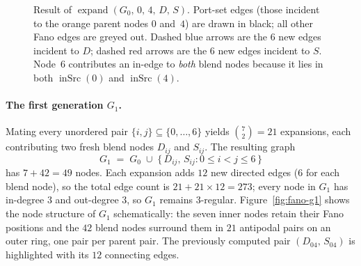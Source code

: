 \documentclass[11pt, a4paper]{article}
\theoremstyle{definition}
\theoremstyle{plain}
\theoremstyle{remark}
\newcommand{\inSrc}{\operatorname{inSrc}}
\newcommand{\expand}{\operatorname{expand}}
\begin{document}
\begin{figure}[ht]
\caption{Result of $\expand(G_0,\,0,\,4,\,D,\,S)$.  Port-set edges (those
incident to the orange parent nodes $0$ and~$4$) are drawn in black; all
other Fano edges are greyed out.  Dashed blue arrows are the $6$ new edges
incident to $D$; dashed red arrows are the $6$ new edges incident to $S$.
Node~$6$ contributes an in-edge to \emph{both} blend nodes because it lies
in both $\inSrc(0)$ and $\inSrc(4)$.}
\label{fig:fano-expand1}
\end{figure}

\paragraph{The first generation $G_1$.}
Mating every unordered pair $\{i,j\} \subseteq \{0,\ldots,6\}$ yields
$\binom{7}{2} = 21$ expansions, each contributing two fresh blend nodes
$D_{ij}$ and $S_{ij}$.  The resulting graph
\[
  G_1 \;=\; G_0 \;\cup\; \bigl\{\,D_{ij},\,S_{ij} : 0 \le i < j \le 6\,\bigr\}
\]
has $7 + 42 = 49$ nodes.  Each expansion adds $12$ new directed edges ($6$ for
each blend node), so the total edge count is $21 + 21 \times 12 = 273$; every
node in $G_1$ has in-degree $3$ and out-degree $3$, so $G_1$ remains
$3$-regular.  Figure~\ref{fig:fano-g1} shows the node structure of $G_1$
schematically: the seven inner nodes retain their Fano positions and the $42$
blend nodes surround them in $21$ antipodal pairs on an outer ring, one pair
per parent pair.  The previously computed pair $(D_{04},\,S_{04})$ is
highlighted with its $12$ connecting edges.
\end{document}
